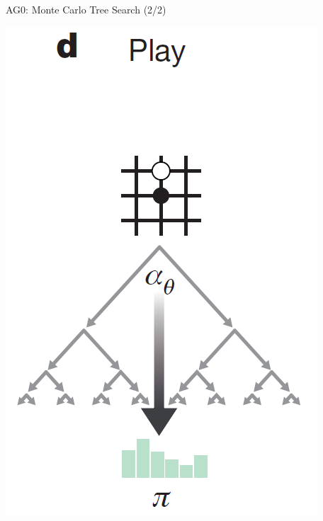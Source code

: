 \documentclass{beamer}
\begin{document}
{    \begin{frame}{AG0: Monte Carlo Tree Search (2/2)}
      \begin{center}
        \includegraphics[height=.85\textheight]{../img/AG0-paper/MCTS-2.png}
      \end{center}
    \end{frame}

}
\end{document}
